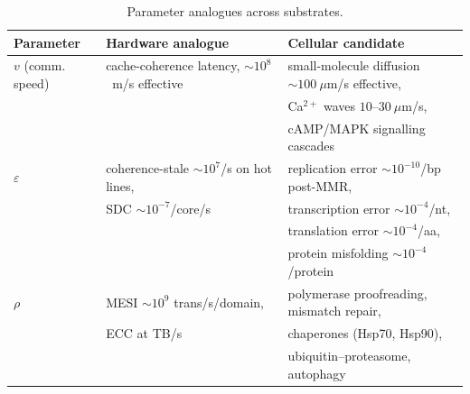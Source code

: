 \documentclass[11pt]{article}
\begin{document}
\begin{table}[h]
\centering
\small
\begin{tabular}{@{}lll@{}}
\toprule
\textbf{Parameter} & \textbf{Hardware analogue} & \textbf{Cellular candidate} \\ \midrule
$v$ (comm. speed) & cache-coherence latency, $\sim 10^{8}$~m/s effective & small-molecule diffusion $\sim 100~\mu$m/s effective, \\
                  &                                & Ca$^{2+}$ waves $10$--$30~\mu$m/s, \\
                  &                                & cAMP/MAPK signalling cascades \\[3pt]
$\varepsilon$     & coherence-stale $\sim 10^{7}$/s on hot lines, & replication error $\sim 10^{-10}$/bp post-MMR, \\
                  & SDC $\sim 10^{-7}$/core/s & transcription error $\sim 10^{-4}$/nt, \\
                  &                                & translation error $\sim 10^{-4}$/aa, \\
                  &                                & protein misfolding $\sim 10^{-4}$/protein \\[3pt]
$\rho$            & MESI $\sim 10^{9}$ trans/s/domain, & polymerase proofreading, mismatch repair, \\
                  & ECC at TB/s                    & chaperones (Hsp70, Hsp90), \\
                  &                                & ubiquitin--proteasome, autophagy \\
\bottomrule
\end{tabular}
\caption{Parameter analogues across substrates.}
\end{table}
\end{document}
